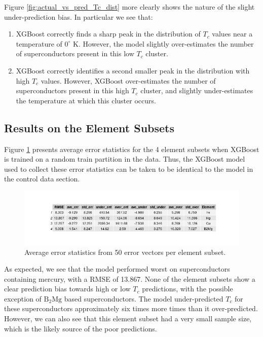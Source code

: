\documentclass[oneside,12pt]{amsart}
\begin{document}
Figure \ref{fig:actual_vs_pred_Tc_dist} more clearly shows the nature of the slight under-prediction bias. In particular we see that:
\begin{enumerate}
     \item XGBoost correctly finds a sharp peak in the distribution of $T_c$ values near a temperature of $0^\circ$ K. However, the model slightly over-estimates the number of superconductors present in this low $T_c$ cluster.
     \item XGBoost correctly identifies a second smaller peak in the distribution with high $T_c$ values. However, XGBoost over-estimates the number of superconductors present in this high $T_c$ cluster, and slightly under-estimates the temperature at which this cluster occurs.
 \end{enumerate}
 
\subsection{Results on the Element Subsets}

 
 Figure \ref{fig:elemental_ntr_tbl} presents average error statistics for the 4 element subsets when XGBoost is trained on a random train partition in the data. Thus, the XGBoost model used to collect these error statistics can be taken to be identical to the model in the control data section.
 
 \begin{figure}[ht]
     \centering
     \includegraphics[width = \linewidth]{../Plots/element_no_retrain_tbl.png}
     \caption{Average error statistics from 50 error vectors per element subset.}
     \label{fig:elemental_ntr_tbl}
 \end{figure}
 
As expected, we see that the model performed worst on superconductors containing mercury, with a RMSE of 13.867. None of the element subsets show a clear prediction bias towards high or low $T_c$ predictions, with the possible exception of $\text{B}_2\text{Mg}$ based superconductors. The model under-predicted $T_c$ for these superconductors approximately six times more times than it over-predicted. However, we can also see that this element subset had a very small sample size, which is the likely source of the poor predictions.
\end{document}
